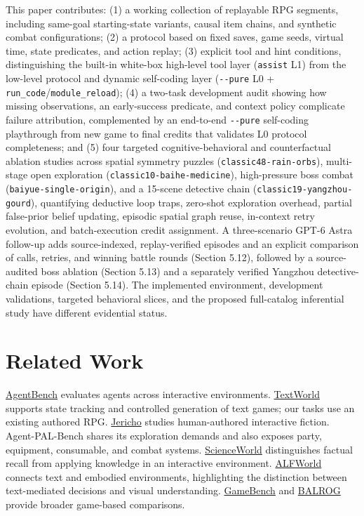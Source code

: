 \documentclass[11pt,a4paper]{article}
\begin{document}
This paper contributes: (1) a working collection of replayable RPG segments, including same-goal starting-state variants, causal item chains, and synthetic combat configurations; (2) a protocol based on fixed saves, game seeds, virtual time, state predicates, and action replay; (3) explicit tool and hint conditions, distinguishing the built-in white-box high-level tool layer (\texttt{assist} L1) from the low-level protocol and dynamic self-coding layer (\texttt{-\allowbreak{}-\allowbreak{}pure} L0 + \texttt{run\allowbreak{}\_\allowbreak{}code}/\texttt{module\allowbreak{}\_\allowbreak{}reload}); (4) a two-task development audit showing how missing observations, an early-success predicate, and context policy complicate failure attribution, complemented by an end-to-end \texttt{-\allowbreak{}-\allowbreak{}pure} self-coding playthrough from new game to final credits that validates L0 protocol completeness; and (5) four targeted cognitive-behavioral and counterfactual ablation studies across spatial symmetry puzzles (\texttt{classic48\allowbreak{}-\allowbreak{}rain\allowbreak{}-\allowbreak{}orbs}), multi-stage open exploration (\texttt{classic10\allowbreak{}-\allowbreak{}baihe\allowbreak{}-\allowbreak{}medicine}), high-pressure boss combat (\texttt{baiyue\allowbreak{}-\allowbreak{}single\allowbreak{}-\allowbreak{}origin}), and a 15-scene detective chain (\texttt{classic19\allowbreak{}-\allowbreak{}yangzhou\allowbreak{}-\allowbreak{}gourd}), quantifying deductive loop traps, zero-shot exploration overhead, partial false-prior belief updating, episodic spatial graph reuse, in-context retry evolution, and batch-execution credit assignment. A three-scenario GPT-6 Astra follow-up adds source-indexed, replay-verified episodes and an explicit comparison of calls, retries, and winning battle rounds (Section 5.12), followed by a source-audited boss ablation (Section 5.13) and a separately verified Yangzhou detective-chain episode (Section 5.14). The implemented environment, development validations, targeted behavioral slices, and the proposed full-catalog inferential study have different evidential status.

\section{\texorpdfstring{Related Work}{Related Work}}

\href{https://arxiv.org/abs/2308.03688}{AgentBench} evaluates agents across interactive environments. \href{https://arxiv.org/abs/1806.11532}{TextWorld} supports state tracking and controlled generation of text games; our tasks use an existing authored RPG. \href{https://arxiv.org/abs/1909.05398}{Jericho} studies human-authored interactive fiction. Agent-PAL-Bench shares its exploration demands and also exposes party, equipment, consumable, and combat systems. \href{https://arxiv.org/abs/2203.07540}{ScienceWorld} distinguishes factual recall from applying knowledge in an interactive environment. \href{https://arxiv.org/abs/2010.03768}{ALFWorld} connects text and embodied environments, highlighting the distinction between text-mediated decisions and visual understanding. \href{https://arxiv.org/abs/2406.06613}{GameBench} and \href{https://arxiv.org/abs/2411.13543}{BALROG} provide broader game-based comparisons.
\end{document}
